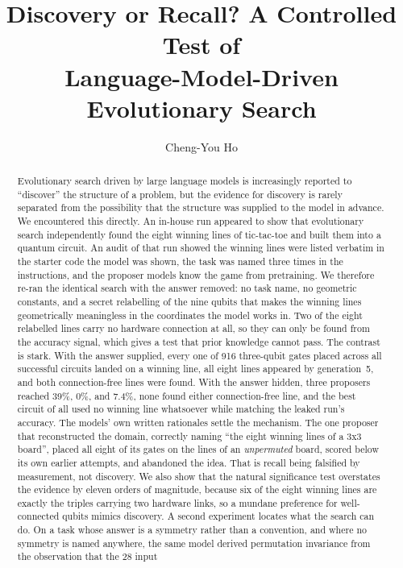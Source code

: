 \documentclass[11pt]{article}
\title{\bfseries Discovery or Recall? A Controlled Test of\\
Language-Model-Driven Evolutionary Search}
\author[ ]{Cheng-You Ho}
\affil[ ]{\normalsize\texttt{}}
\date{}
\begin{document}
\maketitle

\begin{abstract}
\noindent
Evolutionary search driven by large language models is increasingly reported to
``discover'' the structure of a problem, but the evidence for discovery is rarely
separated from the possibility that the structure was supplied to the model in
advance. We encountered this directly. An in-house run appeared to show that
evolutionary search independently found the eight winning lines of tic-tac-toe
and built them into a quantum circuit. An audit of that run showed the winning
lines were listed verbatim in the starter code the model was shown, the task was
named three times in the instructions, and the proposer models know the game from
pretraining. We therefore re-ran the identical search with the answer removed:
no task name, no geometric constants, and a secret relabelling of the nine qubits
that makes the winning lines geometrically meaningless in the coordinates the
model works in. Two of the eight relabelled lines carry no hardware connection at
all, so they can only be found from the accuracy signal, which gives a test that
prior knowledge cannot pass. The contrast is stark. With the answer supplied,
every one of 916 three-qubit gates placed across all successful circuits landed on
a winning line, all eight lines appeared by generation~5, and both
connection-free lines were found. With the answer hidden, three proposers reached
39\%, 0\%, and 7.4\%, none found either connection-free line, and the best circuit
of all used no winning line whatsoever while matching the leaked run's accuracy.
The models' own written rationales settle the mechanism. The one proposer that
reconstructed the domain, correctly naming ``the eight winning lines of a 3x3
board'', placed all eight of its gates on the lines of an \emph{unpermuted} board,
scored below its own earlier attempts, and abandoned the idea. That is recall
being falsified by measurement, not discovery. We also show that the natural
significance test overstates the evidence by eleven orders of magnitude, because
six of the eight winning lines are exactly the triples carrying two hardware
links, so a mundane preference for well-connected qubits mimics discovery. A
second experiment locates what the search can do. On a task whose answer is a
symmetry rather than a convention, and where no symmetry is named anywhere, the
same model derived permutation invariance from the observation that the 28 input

\end{abstract}
\end{document}
